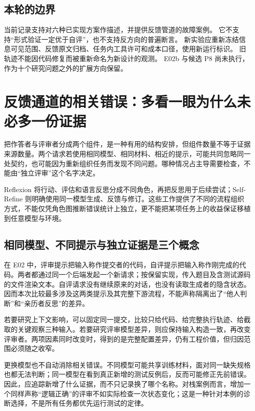 

\subsection{本轮的边界}
\label{sec:ch04-limits}

当前记录支持对六种已实现方案作描述，并提供反馈管道的故障案例。
它不支持“形式验证一定优于自评”，也不支持反方向的普遍断言。
新实验应重新冻结信息可见范围、反馈原文归档、任务内工具许可和成本口径，使用新运行标识。
旧轨迹不能因代码修复而被重新命名为新设计的观测。
E02b 与候选 P8 尚未执行，作为十个研究问题之外的扩展方向保留。

\section{反馈通道的相关错误：多看一眼为什么未必多一份证据}
\label{sec:ch04-correlated}

把作答者与评审者分成两个组件，是一种有用的结构安排，但组件数量不等于证据来源数量。两个请求若使用相同模型、相同材料、相近的提示，可能共同忽略同一处契约，也可能因为重新组织任务而发现不同问题。哪种情况占主导需要检查，不能由“独立评审”这个名字决定。

Reflexion 将行动、评估和语言反思分成不同角色，再把反思用于后续尝试；Self-Refine 则明确使用同一模型生成、反馈与修订\cite{reflexion-2303,self-refine-2303}。这些工作提供了不同的流程组织方式，不能仅凭角色图推断错误统计上独立，更不能把某项任务上的收益保证移植到任意模型与环境。

\subsection{相同模型、不同提示与独立证据是三个概念}

在 E02 中，评审提示把输入称作提交者的代码，自评提示把输入称作刚完成的代码。两者都通过同一个后端发起一个新请求；按保留实现，传入题目及含测试源码的文件渲染文本。自评请求没有继续原来的对话，也没有读取生成者的隐含状态。因而本次比较最多涉及这两类提示及其完整下游流程，不能声称隔离出了“他人判断”和“亲历者反思”的差异。

若要研究上下文影响，可以固定同一提交，比较只给代码、给完整执行轨迹、给截取的关键观察三种输入。若要研究评审模型差异，则应保持输入构造一致，再改变评审者。两项因素同时改变时，得到的是完整配置差异，仍有工程价值，但归因范围必须随之收窄。

更换模型也不自动消除相关错误。不同模型可能共享训练材料，面对同一缺失规格也都无法判断；同一模型在看到真正新增的测试反例后，反而可能修正先前错误。因此，应追踪新增了什么证据，而不只记录换了哪个名称。对栈案例而言，增加一个同样声称“逻辑正确”的评审不如实际检查一次状态变化；这是一种针对本例的诊断选择，不是所有任务都优先运行测试的定律。

